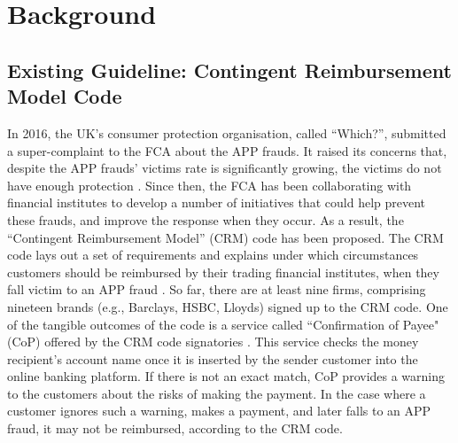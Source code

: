
\section{Background}


\subsection{Existing Guideline: Contingent Reimbursement Model Code}

In  2016, the UK's consumer protection organisation, called ``Which?'', submitted a super-complaint to the FCA about the APP frauds. It raised its concerns that, despite the APP frauds' victims rate is significantly growing, the victims do not have enough protection \cite{Which?-super-complaint}.  Since then, the FCA has been collaborating with financial institutes  to develop a number of initiatives that
could help prevent these frauds, and improve the response when they  occur. As a result,  the ``Contingent Reimbursement Model'' (CRM) code has been proposed. The  CRM code  lays out a set of requirements and explains under which circumstances customers should be reimbursed by their trading financial institutes, when they fall victim to an APP fraud \cite{CRM-code}. So far,  there are at least nine firms, comprising nineteen brands (e.g., Barclays, HSBC,  Lloyds) signed up to the CRM code. One of the tangible outcomes of the code is a service called ``Confirmation of Payee" (CoP)  offered by the CRM code signatories \cite{CoP}. This service checks the money recipient's account name once it is inserted by the sender customer into the online banking platform. If there is not an exact match, CoP provides a warning to the  customers about the risks of making the payment. In the case where a customer ignores such a warning, makes a payment, and later falls to an APP fraud,  it may not be reimbursed, according to the CRM code.


